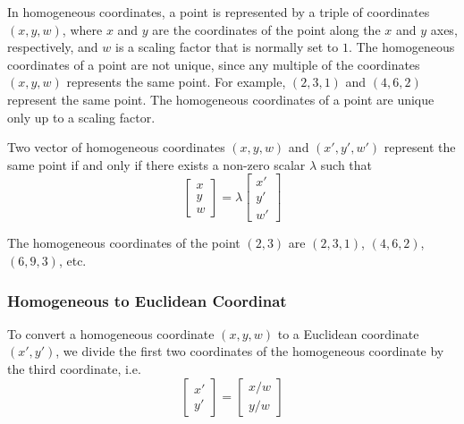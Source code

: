 \begin{center}
\end{center}

In homogeneous coordinates, a point is represented by a triple of coordinates $(x, y, w)$, where $x$ and $y$ are the coordinates of the point along the $x$ and $y$ axes, respectively, and $w$ is a scaling factor that is normally set to $1$. The homogeneous coordinates of a point are not unique, since any multiple of the coordinates $(x, y, w)$ represents the same point. For example, $(2, 3, 1)$ and $(4, 6, 2)$ represent the same point. The homogeneous coordinates of a point are unique only up to a scaling factor. 

\begin{remark}
    Two vector of homogeneous coordinates $(x, y, w)$ and $(x', y', w')$ represent the same point if and only if there exists a non-zero scalar $\lambda$ such that \[
        \begin{bmatrix}
            x \\
            y \\
            w
        \end{bmatrix} = \lambda \begin{bmatrix}
            x' \\
            y' \\
            w'
        \end{bmatrix}
    \]
\end{remark}

\begin{example}
    The homogeneous coordinates of the point $(2, 3)$ are $(2, 3, 1)$, $(4, 6, 2)$, $(6, 9, 3)$, etc.
\end{example}

\subsubsection{Homogeneous to Euclidean Coordinat}

To convert a homogeneous coordinate $(x, y, w)$ to a Euclidean coordinate $(x', y')$, we divide the first two coordinates of the homogeneous coordinate by the third coordinate, i.e. \[
    \begin{bmatrix}
        x' \\
        y'
    \end{bmatrix} = \begin{bmatrix}
        x / w \\
        y / w
    \end{bmatrix}
\]

